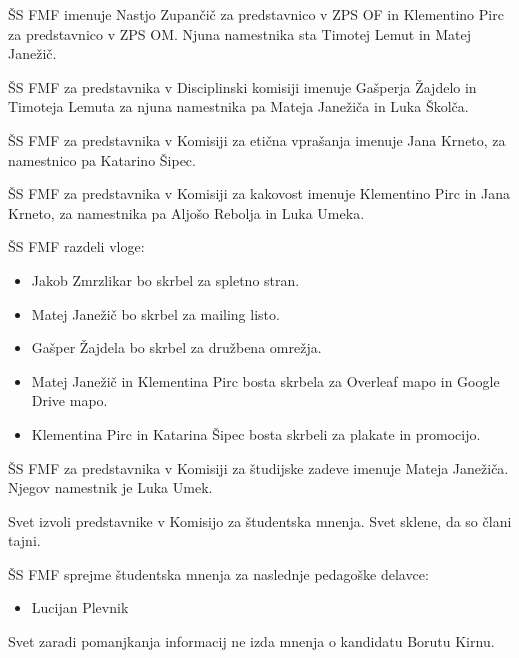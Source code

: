 \documentclass{seja}
\begin{document}
\begin{ad}
	\begin{sklep*}
	ŠS FMF imenuje Nastjo Zupančič za predstavnico v ZPS OF in Klementino Pirc za predstavnico v ZPS OM. Njuna namestnika sta Timotej Lemut in Matej Janežič.
	\end{sklep*}
	
	\begin{sklep*}
	ŠS FMF za predstavnika v Disciplinski komisiji imenuje Gašperja Žajdelo in Timoteja Lemuta za njuna namestnika pa Mateja Janežiča in Luka Školča.
	\end{sklep*}
	
	\begin{sklep*}
	ŠS FMF za predstavnika v Komisiji za etična vprašanja imenuje Jana Krneto, za namestnico pa Katarino Šipec.
	\end{sklep*}
	
	\begin{sklep*}
	ŠS FMF za predstavnika v Komisiji za kakovost imenuje Klementino Pirc in Jana Krneto, za namestnika pa Aljošo Rebolja in Luka Umeka.
	\end{sklep*}
	
	\begin{sklep*}
	ŠS FMF razdeli vloge:
		\begin{itemize}
			\item 
			Jakob Zmrzlikar bo skrbel za spletno stran.
			\item 
			Matej Janežič bo skrbel za mailing listo.
			\item 
			Gašper Žajdela bo skrbel za družbena omrežja.
			\item 
			Matej Janežič in Klementina Pirc bosta skrbela za Overleaf mapo in Google Drive mapo.
			\item 
			Klementina Pirc in Katarina Šipec bosta skrbeli za plakate in promocijo.
			\end{itemize}
	\end{sklep*}
	
	\begin{sklep*}
	ŠS FMF za predstavnika v Komisiji za študijske zadeve imenuje Mateja Janežiča. Njegov namestnik je Luka Umek.
	\end{sklep*}
	
	\begin{sklep*}
		Svet izvoli predstavnike v Komisijo za študentska mnenja. 
		Svet sklene, da so člani tajni.
	\end{sklep*}
	
	\item
	\begin{sklep*} 
    ŠS FMF sprejme študentska mnenja za naslednje pedagoške delavce:
        \begin{itemize}
            \item Lucijan Plevnik
        \end{itemize}
    Svet zaradi pomanjkanja informacij ne izda mnenja o kandidatu Borutu Kirnu.
    \end{sklep*}
    

\end{ad}
\end{document}
